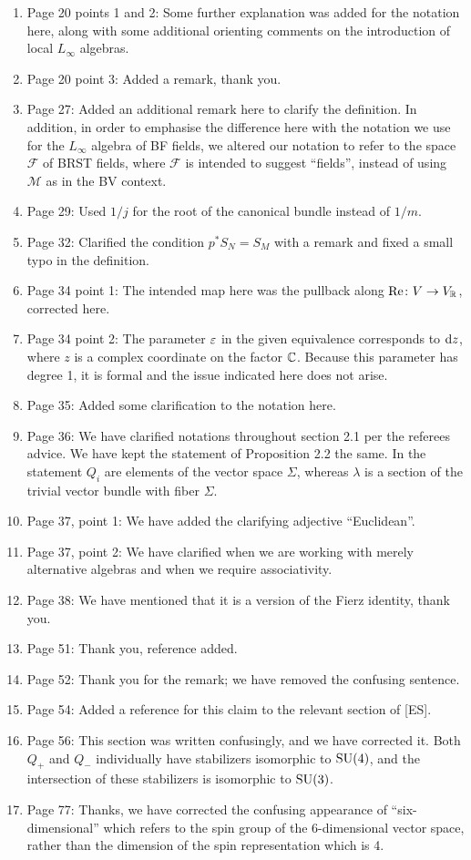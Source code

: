 \documentclass[10pt, oneside]{article}
\begin{document}
\begin{enumerate}
 \item Page 20 points 1 and 2: Some further explanation was added for the notation here, along with some additional orienting comments on the introduction of local $L_\infty$ algebras.
 \item Page 20 point 3: Added a remark, thank you.
 \item Page 27: Added an additional remark here to clarify the definition.  In addition, in order to emphasise the difference here with the notation we use for the $L_\infty$ algebra of BF fields, we altered our notation to refer to the space $\mathcal F$ of BRST fields, where $\mathcal F$ is intended to suggest ``fields'', instead of using $\mathcal M$ as in the BV context. \item Page 29: Used $1/j$ for the root of the canonical bundle instead of $1/m$.
 \item Page 32: Clarified the condition $p^*S_N = S_M$ with a remark and fixed a small typo in the definition.
 \item Page 34 point 1: The intended map here was the pullback along $\mathrm{Re} \colon V \to V_\mathbb R$, corrected here.
 \item Page 34 point 2: The parameter $\varepsilon$ in the given equivalence corresponds to ${\rm d} z$, where $z$ is a complex coordinate on the factor $\mathbb C$.  Because this parameter has degree 1, it is formal and the issue indicated here does not arise.
 \item Page 35: Added some clarification to the notation here.
 \item Page 36: We have clarified notations throughout section 2.1 per the referees advice. 
 We have kept the statement of Proposition 2.2 the same. In the statement $Q_i$ are elements of the vector space $\Sigma$, whereas $\lambda$ is a section of the trivial vector bundle with fiber $\Sigma$.
 \item Page 37, point 1: We have added the clarifying adjective ``Euclidean''.
 \item Page 37, point 2: We have clarified when we are working with merely alternative algebras and when we require associativity.
 \item Page 38: We have mentioned that it is a version of the Fierz identity, thank you.
 \item Page 51: Thank you, reference added.
 \item Page 52: Thank you for the remark; we have removed the confusing sentence.
 \item Page 54: Added a reference for this claim to the relevant section of [ES].
 \item Page 56: This section was written confusingly, and we have corrected it.  Both $Q_+$ and $Q_-$ individually have stabilizers isomorphic to $\mathrm{SU}(4)$, and the intersection of these stabilizers is isomorphic to $\mathrm{SU}(3)$.
 \item Page 77: Thanks, we have corrected the confusing appearance of ``six-dimensional'' which refers to the spin group of the 6-dimensional vector space, rather than the dimension of the spin representation which is 4.
\end{enumerate}

 
\end{document}
